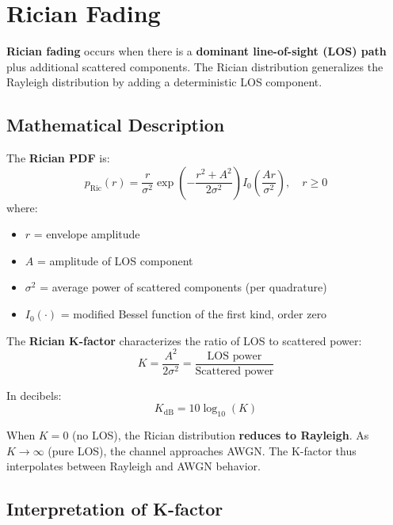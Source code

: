 \section{Rician Fading}

\textbf{Rician fading} occurs when there is a \textbf{dominant line-of-sight (LOS) path} plus additional scattered components. The Rician distribution generalizes the Rayleigh distribution by adding a deterministic LOS component.

\subsection{Mathematical Description}

The \textbf{Rician PDF} is:
\begin{equation}
p_{\text{Ric}}(r) = \frac{r}{\sigma^2} \exp\left(-\frac{r^2 + A^2}{2\sigma^2}\right) I_0\left(\frac{Ar}{\sigma^2}\right), \quad r \geq 0
\end{equation}
where:
\begin{itemize}
\item $r$ = envelope amplitude
\item $A$ = amplitude of LOS component
\item $\sigma^2$ = average power of scattered components (per quadrature)
\item $I_0(\cdot)$ = modified Bessel function of the first kind, order zero
\end{itemize}

The \textbf{Rician K-factor} characterizes the ratio of LOS to scattered power:
\begin{equation}
K = \frac{A^2}{2\sigma^2} = \frac{\text{LOS power}}{\text{Scattered power}}
\end{equation}

In decibels:
\begin{equation}
K_{\text{dB}} = 10\log_{10}(K)
\end{equation}

\begin{keyconcept}
When $K = 0$ (no LOS), the Rician distribution \textbf{reduces to Rayleigh}. As $K \to \infty$ (pure LOS), the channel approaches AWGN. The K-factor thus interpolates between Rayleigh and AWGN behavior.
\end{keyconcept}

\subsection{Interpretation of K-factor}

